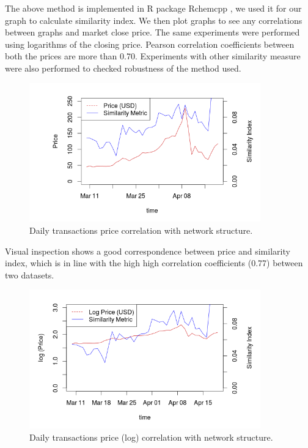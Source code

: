 \documentclass[12pt,a4paper]{article}
\numberwithin{equation}{section}
\numberwithin{figure}{section}
\numberwithin{table}{section}
\begin{document}
The above method is implemented in R package  Rchemcpp \citep{Klambauer2015}, we used it for our graph to calculate similarity index. We then plot graphs to see any correlations between graphs and market close price. The same  experiments were performed using logarithms of the closing price. Pearson correlation coefficients between both the prices are more than 0.70. Experiments with other similarity measure were also performed to checked robustness of the method used.

\begin{figure}[ht]
\begin{center}
\includegraphics[width=100mm]{./figure/pnc.png}
\caption{Daily transactions price correlation with network structure. }
\label{fig:close_transactions}
\end{center}
\end{figure}

Visual inspection shows a good correspondence between price and similarity index, which is in line with the high high correlation coefficients (0.77) between two datasets.

\begin{figure}[ht]
\begin{center}
\includegraphics[width=100mm]{./figure/lpnc.png}
\caption{Daily transactions price (log) correlation with network structure.}
\label{fig:log_transactions}
\end{center}
\end{figure}
\end{document}
